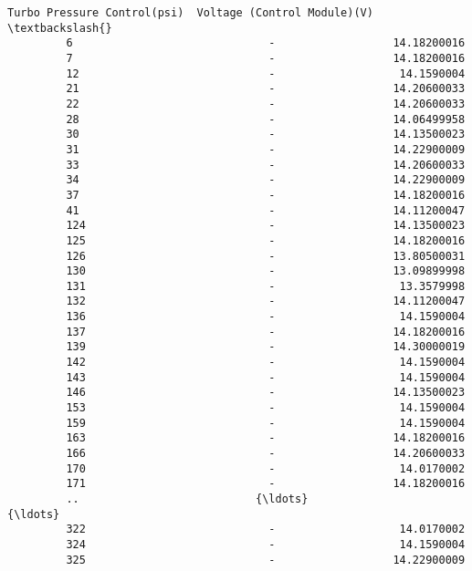 \documentclass[11pt]{article}
\begin{document}
\begin{Verbatim}[commandchars=\\\{\}]
              Turbo Pressure Control(psi)  Voltage (Control Module)(V)  \textbackslash{}
         6                              -                  14.18200016   
         7                              -                  14.18200016   
         12                             -                   14.1590004   
         21                             -                  14.20600033   
         22                             -                  14.20600033   
         28                             -                  14.06499958   
         30                             -                  14.13500023   
         31                             -                  14.22900009   
         33                             -                  14.20600033   
         34                             -                  14.22900009   
         37                             -                  14.18200016   
         41                             -                  14.11200047   
         124                            -                  14.13500023   
         125                            -                  14.18200016   
         126                            -                  13.80500031   
         130                            -                  13.09899998   
         131                            -                   13.3579998   
         132                            -                  14.11200047   
         136                            -                   14.1590004   
         137                            -                  14.18200016   
         139                            -                  14.30000019   
         142                            -                   14.1590004   
         143                            -                   14.1590004   
         146                            -                  14.13500023   
         153                            -                   14.1590004   
         159                            -                   14.1590004   
         163                            -                  14.18200016   
         166                            -                  14.20600033   
         170                            -                   14.0170002   
         171                            -                  14.18200016   
         ..                           {\ldots}                          {\ldots}   
         322                            -                   14.0170002   
         324                            -                   14.1590004   
         325                            -                  14.22900009   

\end{Verbatim}
\end{document}
